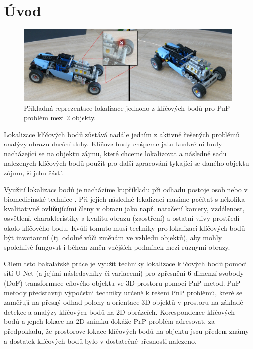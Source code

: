 \chapter{Úvod}
\label{sec:Introduction}

\begin{figure}[H]
\centering
\includegraphics[width=1.0\textwidth,keepaspectratio]{Figures/bp_uvodni_obrazek.jpg}
\caption[Příkladná reprezentace lokalizace klíčového bodu]{Příkladná reprezentace lokalizace jednoho z klíčových bodů pro PnP problém mezi 2 objekty.}
\label{fig:bp_uvodni_obrazek}
\end{figure}


Lokalizace klíčových bodů zůstává nadále jedním z aktivně řešených problémů analýzy obrazu dnešní doby.
Klíčové body chápeme jako konkrétní body nacházející se na objektu zájmu, které chceme lokalizovat a následně sadu nalezených klíčových bodů použít pro další zpracování tykající se daného objektu zájmu, či jeho částí.

Využití lokalizace bodů je nacházíme kupříkladu při odhadu postoje osob \cite{humanpose} nebo v biomedicínské technice \cite{unet}.
Při jejich následné lokalizaci musíme počítat s několika kvalitativně ovliňujícími členy v obrazu jako např. natočení kamery, vzdálenost, osvětlení, charakteristiky a kvalitu obrazu (zaostření) a ostatní vlivy prostředí okolo klíčového bodu. Kvůli tomuto musí techniky pro lokalizaci klíčových bodů být invariantní (tj. odolné vůči změnám ve vzhledu objektů), aby mohly spolehlivě fungovat i během změn vnějších podmínek mezi různými obrazy.

Cílem této bakalářské práce je využít techniky lokalizace klíčových bodů pomocí sítí U-Net (a jejími následovníky či variacemi) pro zpřesnění 6 dimenzí svobody (DoF) transformace cílového objektu ve 3D prostoru pomocí PnP metod. PnP metody představují výpočetní techniky určené k řešení PnP problémů, které se zaměřují na přesný odhad polohy a orientace 3D objektů v prostoru na základě detekce a analýzy klíčových bodů na 2D obrázcích. Korespondence klíčových bodů a jejich lokace na 2D snímku dokáže PnP problém adresovat, za předpokladu, že prostorové lokace klíčových bodů na objektu jsou předem známy a dostatek klíčových bodů bylo v dostatečné přesnosti nalezeno. 

